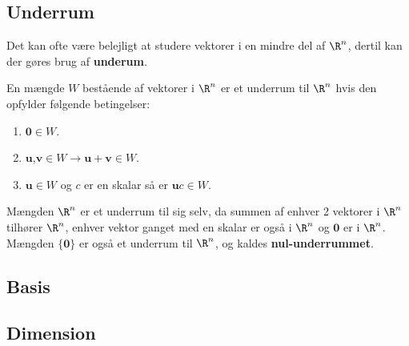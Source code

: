 \subsection{Underrum}
Det kan ofte være belejligt at studere vektorer i en mindre del af $\R^n$, dertil kan der gøres brug af \textbf{underum}.

\begin{defn}{}{}
En mængde $W$ bestående af vektorer i $\R^n$ er et underrum til $\R^n$ hvis den opfylder følgende betingelser:	
\begin{enumerate}[label=(\alph*)]
	\item  $\textbf{0}\in W$.
	\item $\textbf{u}$,$\textbf{v} \in W \rightarrow \textbf{u}+\textbf{v} \in W $.
	\item $\textbf{u} \in W$ og $c$ er en skalar så er $\textbf{u}c \in W$.
\end{enumerate}
\end{defn}
\noindent
Mængden $\R^n$ er et underrum til sig selv, da summen af enhver 2 vektorer i $\R^n$ tilhører $\R^n$, enhver vektor ganget med en skalar er også i $\R^n$ og $\textbf{0}$ er i $\R^n$. Mængden $\{\textbf{0}\}$ er også et underrum til $\R^n$, og kaldes \textbf{nul-underrummet}.


\subsection{Basis}




\subsection{Dimension}